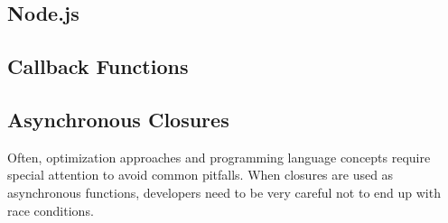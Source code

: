\subsection{Node.js}




\subsection{Callback Functions}

\subsection{Asynchronous Closures}

%


Often, optimization approaches and programming language concepts require special attention to avoid common pitfalls.
When closures are used as asynchronous functions, developers need to be very careful not to end up with race conditions.


